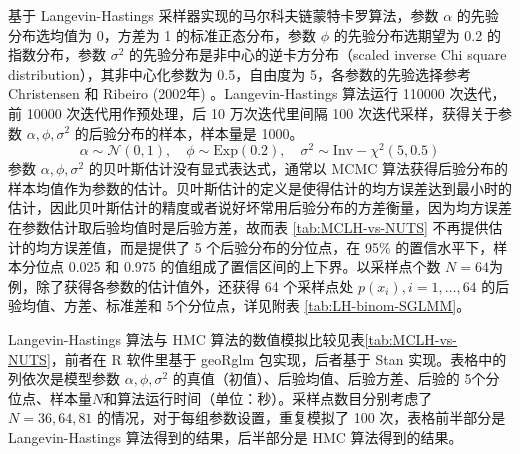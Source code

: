 \documentclass[12pt,a4paper,UTF8,twoside]{book}
\theoremstyle{definition}
\theoremstyle{definition}
\theoremstyle{definition}
\theoremstyle{remark}
\begin{document}
基于 Langevin-Hastings 采样器实现的马尔科夫链蒙特卡罗算法，参数 \(\alpha\) 的先验分布选均值为 0，方差为 1 的标准正态分布，参数 \(\phi\) 的先验分布选期望为 0.2 的指数分布，参数 \(\sigma^2\) 的先验分布是非中心的逆卡方分布（scaled inverse Chi square distribution），其非中心化参数为 0.5，自由度为 5，各参数的先验选择参考 Christensen 和 Ribeiro (2002年) \citep{geoRglm2002}。Langevin-Hastings 算法运行 110000 次迭代，前 10000 次迭代用作预处理，后 10 万次迭代里间隔 100 次迭代采样，获得关于参数 \(\alpha,\phi,\sigma^2\) 的后验分布的样本，样本量是 1000。
\begin{equation}
\alpha \sim \mathcal{N}(0,1), \quad \phi \sim \mathrm{Exp}(0.2), \quad \sigma^2  \sim \mathrm{Inv-}\chi^2(5,0.5)
\end{equation}
参数 \(\alpha,\phi,\sigma^2\) 的贝叶斯估计没有显式表达式，通常以 MCMC 算法获得后验分布的样本均值作为参数的估计。贝叶斯估计的定义是使得估计的均方误差达到最小时的估计，因此贝叶斯估计的精度或者说好坏常用后验分布的方差衡量，因为均方误差在参数估计取后验均值时是后验方差，故而表 \ref{tab:MCLH-vs-NUTS} 不再提供估计的均方误差值，而是提供了 5 个后验分布的分位点，在 95\% 的置信水平下，样本分位点 0.025 和 0.975 的值组成了置信区间的上下界。以采样点个数 \(N =64\)为例，除了获得各参数的估计值外，还获得 64 个采样点处 \(p(x_i), i = 1, \ldots, 64\) 的后验均值、方差、标准差和 5个分位点，详见附表 \ref{tab:LH-binom-SGLMM}。

Langevin-Hastings 算法与 HMC 算法的数值模拟比较见表\ref{tab:MCLH-vs-NUTS}，前者在 R 软件里基于 geoRglm 包实现，后者基于 Stan 实现。表格中的列依次是模型参数 \(\alpha,\phi,\sigma^2\) 的真值（初值）、后验均值、后验方差、后验的 5个分位点、样本量\(N\)和算法运行时间（单位：秒）。采样点数目分别考虑了 \(N = 36, 64, 81\) 的情况，对于每组参数设置，重复模拟了 100 次，表格前半部分是 Langevin-Hastings 算法得到的结果，后半部分是 HMC 算法得到的结果。
\end{document}
